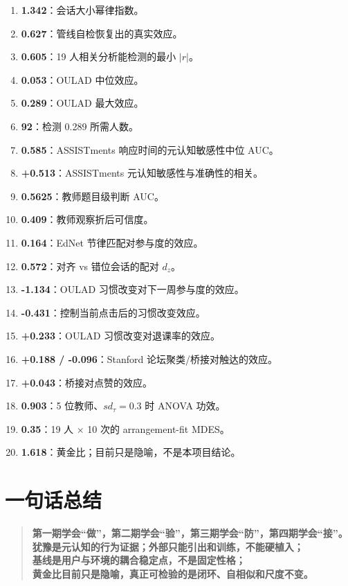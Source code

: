 \documentclass[UTF8,a4paper,11pt]{ctexart}
\begin{document}
\begin{enumerate}[leftmargin=2em]
\item \textbf{1.342}：会话大小幂律指数。
\item \textbf{0.627}：管线自检恢复出的真实效应。
\item \textbf{0.605}：19 人相关分析能检测的最小 $|r|$。
\item \textbf{0.053}：OULAD 中位效应。
\item \textbf{0.289}：OULAD 最大效应。
\item \textbf{92}：检测 0.289 所需人数。
\item \textbf{0.585}：ASSISTments 响应时间的元认知敏感性中位 AUC。
\item \textbf{+0.513}：ASSISTments 元认知敏感性与准确性的相关。
\item \textbf{0.5625}：教师题目级判断 AUC。
\item \textbf{0.409}：教师观察折后可信度。
\item \textbf{0.164}：EdNet 节律匹配对参与度的效应。
\item \textbf{0.572}：对齐 vs 错位会话的配对 $d_z$。
\item \textbf{-1.134}：OULAD 习惯改变对下一周参与度的效应。
\item \textbf{-0.431}：控制当前点击后的习惯改变效应。
\item \textbf{+0.233}：OULAD 习惯改变对退课率的效应。
\item \textbf{+0.188 / -0.096}：Stanford 论坛聚类/桥接对触达的效应。
\item \textbf{+0.043}：桥接对点赞的效应。
\item \textbf{0.903}：5 位教师、$sd_\tau=0.3$ 时 ANOVA 功效。
\item \textbf{0.35}：19 人 $\times$ 10 次的 arrangement-fit MDES。
\item \textbf{1.618}：黄金比；目前只是隐喻，不是本项目结论。
\end{enumerate}


\section{一句话总结}

\begin{quote}
\large
\textbf{第一期学会“做”，第二期学会“验”，第三期学会“防”，第四期学会“接”。}\\[6pt]
\textbf{犹豫是元认知的行为证据；外部只能引出和训练，不能硬植入；}\\
\textbf{基线是用户与环境的耦合稳定点，不是固定性格；}\\
\textbf{黄金比目前只是隐喻，真正可检验的是闭环、自相似和尺度不变。}
\end{quote}
\end{document}
